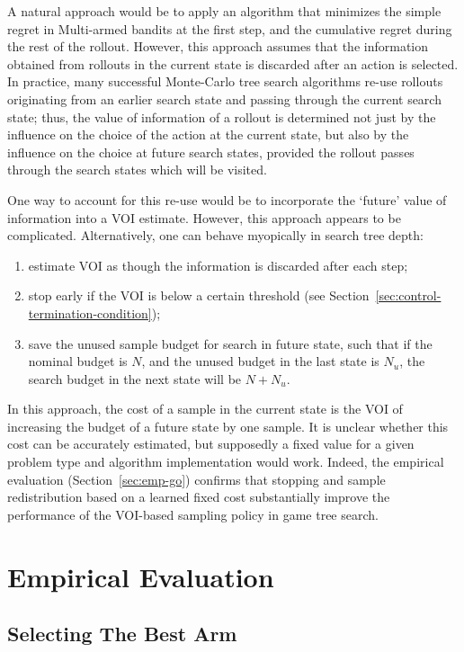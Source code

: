 \documentclass[]{article}
\begin{document}
A natural approach would be to apply an algorithm that minimizes the
simple regret in Multi-armed bandits at the first step, and the
cumulative regret during the rest of the rollout.  However, this
approach assumes that the information obtained from rollouts in the
current state is discarded after an action is selected. In practice,
many successful Monte-Carlo tree search algorithms re-use rollouts
originating from an earlier search state and passing through the
current search state; thus, the value of information of a rollout is
determined not just by the influence on the choice of the action at
the current state, but also by the influence on the choice at future
search states, provided the rollout passes through the search states
which will be visited.

One way to account for this re-use would be to incorporate the
`future' value of information into a VOI estimate. However, this 
approach appears to be complicated. Alternatively, one can behave
myopically in search tree depth:
\begin{enumerate}
\item estimate VOI as though the information is discarded after each step;
\item stop early if the VOI is below a certain threshold
   (see Section~\ref{sec:control-termination-condition});
\item save the unused sample budget for search in future state, such that
   if the nominal budget is $N$, and the unused budget in the last state
   is $N_u$, the search budget in the next state will be $N+N_u$.
\end{enumerate}
In this approach, the cost of a sample in the current state is the
VOI of increasing the budget of a future state by one sample.  It is
unclear whether this cost can be accurately estimated, but supposedly
a fixed value for a given problem type and algorithm implementation
would work. Indeed, the empirical evaluation (Section~\ref{sec:emp-go})
confirms that stopping and sample redistribution based on a learned
fixed cost  substantially improve the performance of the VOI-based
sampling policy in game tree search.

\section{Empirical Evaluation}
\label{sec:empirical-evaluation}

\subsection{Selecting The Best Arm}
\label{sec:emp-arm}
\end{document}
